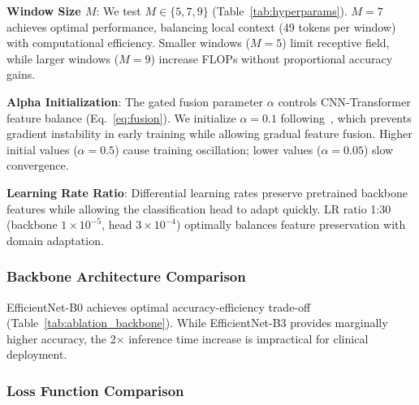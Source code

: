 \textbf{Window Size $M$}: We test $M \in \{5, 7, 9\}$ (Table~\ref{tab:hyperparams}). $M=7$ achieves optimal performance, balancing local context (49 tokens per window) with computational efficiency. Smaller windows ($M=5$) limit receptive field, while larger windows ($M=9$) increase FLOPs without proportional accuracy gains.

\textbf{Alpha Initialization}: The gated fusion parameter $\alpha$ controls CNN-Transformer feature balance (Eq.~\ref{eq:fusion}). We initialize $\alpha=0.1$ following~\cite{touvron2021training}, which prevents gradient instability in early training while allowing gradual feature fusion. Higher initial values ($\alpha=0.5$) cause training oscillation; lower values ($\alpha=0.05$) slow convergence.

\textbf{Learning Rate Ratio}: Differential learning rates preserve pretrained backbone features while allowing the classification head to adapt quickly. LR ratio 1:30 (backbone $1\times10^{-5}$, head $3\times10^{-4}$) optimally balances feature preservation with domain adaptation.

\subsubsection{Backbone Architecture Comparison}

\begin{table}[htbp]
\centering
\caption{Backbone Architecture Comparison}
\label{tab:ablation_backbone}
\small
{}
\end{table}

EfficientNet-B0 achieves optimal accuracy-efficiency trade-off (Table~\ref{tab:ablation_backbone}). While EfficientNet-B3 provides marginally higher accuracy, the 2$\times$ inference time increase is impractical for clinical deployment.

\subsubsection{Loss Function Comparison}

